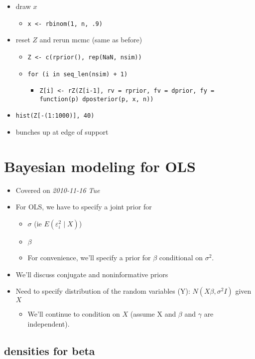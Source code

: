 \begin{itemize}
\begin{itemize}
\item draw $x$
\begin{itemize}
\item \texttt{x <- rbinom(1, n, .9)}
\end{itemize}
\item reset $Z$ and rerun mcmc (same as before)
\begin{itemize}
\item \texttt{Z <- c(rprior(), rep(NaN, nsim))}
\item \texttt{for (i in seq\_len(nsim) + 1)}
\begin{itemize}
\item \texttt{Z[i] <- rZ(Z[i-1], rv = rprior, fv = dprior, fy = function(p) dposterior(p, x, n))}
\end{itemize}
\end{itemize}
\item \texttt{hist(Z[-(1:1000)], 40)}
\item bunches up at edge of support
\end{itemize}
\end{itemize}
\section{Bayesian modeling for OLS}
\label{sec-4}

\begin{itemize}
\item Covered on \textit{2010-11-16 Tue}
\item For OLS, we have to specify a joint prior for
\begin{itemize}
\item $\sigma$ (ie $E(\varepsilon_{i}^{2}\mid X)$)
\item $\beta$
\item For convenience, we'll specify a prior for $\beta$
        conditional on $\sigma^2$.
\end{itemize}
\item We'll discuss conjugate and noninformative priors
\item Need to specify distribution of the random variables (Y): $N(X\beta,
      \sigma^{2} I)$ given $X$
\begin{itemize}
\item We'll continue to condition on $X$ (assume X and $\beta$ and
        $\gamma$ are independent).
\end{itemize}
\end{itemize}
\subsection{densities for beta}
\label{sec-4-1}

